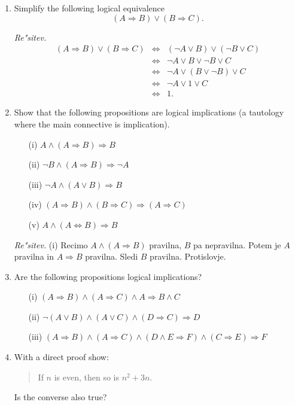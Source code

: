 \documentclass[11pt,paper=b5,footinclude,headinclude]{scrbook} %
\theoremstyle{remark}
\theoremstyle{definition} %
\theoremstyle{theorem} %
\begin{document}
\begin{enumerate}
\item Simplify the following logical equivalence
$$(A\Rightarrow B) \vee (B \Rightarrow C).$$

\emph{Re"sitev.} 
\begin{eqnarray*}
(A\Rightarrow B) \vee (B \Rightarrow C) &\Leftrightarrow & (\neg A \vee B) \vee (\neg B \vee C)\\
&\Leftrightarrow & \neg A \vee B \vee \neg B \vee C\\
&\Leftrightarrow & \neg A \vee (B \vee \neg B) \vee C\\
&\Leftrightarrow & \neg A \vee 1 \vee C\\
&\Leftrightarrow & 1.
\end{eqnarray*}

\item Show that the following propositions are logical implications (a tautology where the main connective is implication).
\begin{enumerate}
\item[(i)] $A \wedge (A \Rightarrow B) \Rightarrow B$
\item[(ii)] $\neg B \wedge (A \Rightarrow B) \Rightarrow \neg A$
\item[(iii)] $\neg A \wedge (A \vee B) \Rightarrow B$
\item[(iv)] $(A \Rightarrow B) \wedge (B \Rightarrow C) \Rightarrow (A \Rightarrow C)$
\item[(v)] $A \wedge (A \Leftrightarrow B) \Rightarrow B$
\end{enumerate}

\emph{Re"sitev.} (i) Recimo $A \wedge (A \Rightarrow B)$ pravilna, $B$ pa nepravilna. Potem je $A$ pravilna in $A\Rightarrow B$ pravilna. Sledi $B$ pravilna. Protislovje. 


\item Are the following propositions logical implications?
\begin{enumerate}
\item[(i)] $(A \Rightarrow B ) \wedge (A \Rightarrow C) \wedge A \Rightarrow B \wedge C$
\item[(ii)] $\neg (A \vee B) \wedge (A\vee C) \wedge (D\Rightarrow C) \Rightarrow D$
\item[(iii)] $(A\Rightarrow B) \wedge (A\Rightarrow C) \wedge (D\wedge E \Rightarrow F) \wedge (C\Rightarrow E) \Rightarrow F$
\end{enumerate}

\item With a direct proof show:
\begin{quote}
    If $n$ is even, then so is $n^2 +3n$.
\end{quote}
Is the converse also true?


\end{enumerate}
\end{document}
